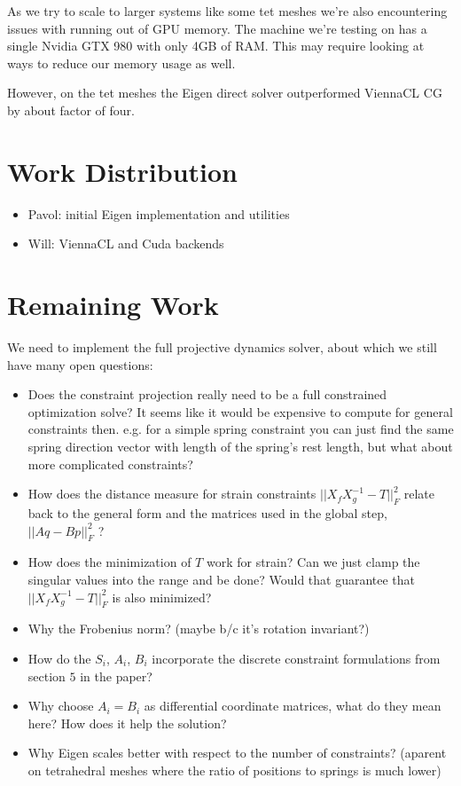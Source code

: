 \documentclass[11pt]{article}
\begin{document}
As we try to scale to larger systems like some tet meshes we're
also encountering issues with running out of GPU memory. The machine we're testing on has a single
Nvidia GTX 980 with only 4GB of RAM. This may require looking at ways to reduce our memory usage
as well.

However, on the tet meshes the Eigen direct solver outperformed ViennaCL CG by
about factor of four.

\section{Work Distribution}

\begin{itemize}
	\item Pavol: initial Eigen implementation and utilities
	\item Will: ViennaCL and Cuda backends
\end{itemize}

\section{Remaining Work}

We need to implement the full projective dynamics solver, about which we still have many open
questions:

\begin{itemize}
	\item Does the constraint projection really need to be a full constrained optimization solve? It seems
		like it would be expensive to compute for general constraints then. e.g. for a simple spring constraint
		you can just find the same spring direction vector with length of the spring's rest length, but what
		about more complicated constraints?

	\item How does the distance measure for strain constraints $|| X_f X^{-1}_g - T ||^2_F$ relate back to the
		general form and the matrices used in the global step, $||Aq - Bp||^2_F$ ?

	\item How does the minimization of $T$ work for strain? Can we just clamp the singular values into the
		range and be done? Would that guarantee that $|| X_f X^{-1}_g - T ||^2_F$ is also minimized?

	\item Why the Frobenius norm? (maybe b/c it's rotation invariant?)
	\item How do the $S_i$, $A_i$, $B_i$ incorporate the discrete constraint formulations from
		section $5$ in the paper?
	\item Why choose $A_i = B_i$ as differential coordinate matrices, what do they
		mean here? How does it help the solution?
        \item Why Eigen scales better with respect to the number of constraints?
              (aparent on tetrahedral meshes where the ratio of positions to
               springs is much lower)
\end{itemize}
\end{document}
